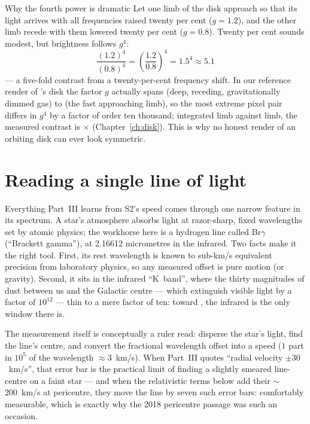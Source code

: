 \begin{worked}{Why the fourth power is dramatic}
Let one limb of the disk approach so that its light arrives with all
frequencies raised twenty per cent ($g = 1.2$), and the other limb
recede with them lowered twenty per cent ($g = 0.8$). Twenty per cent
sounds modest, but brightness follows $g^4$:
\[
\frac{(1.2)^4}{(0.8)^4} = \left(\frac{1.2}{0.8}\right)^4 = 1.5^4
\approx 5.1
\]
— a five-fold contrast from a twenty-per-cent frequency shift. In our
reference render of \sgra{}'s disk the factor $g$ actually spans
\GMin{} (deep, receding, gravitationally dimmed gas) to \GMax{} (the
fast approaching limb), so the most extreme pixel pair differs in $g^4$
by a factor of order ten thousand; integrated limb against limb, the
measured contrast is \BeamRatio$\times$ (Chapter~\ref{ch:disk}). This
is why no honest render of an orbiting disk can ever look symmetric.
\end{worked}

\section{Reading a single line of light}

Everything Part~III learns from S2's speed comes through one narrow
feature in its spectrum. A star's atmosphere absorbs light at
razor-sharp, fixed wavelengths set by atomic physics; the workhorse
here is a hydrogen line called Br$\gamma$ (``Brackett gamma''), at
2.16612 micrometres in the infrared. Two facts make it the right
tool. First, its rest wavelength is known to sub-km/s equivalent
precision from laboratory physics, so any measured offset is pure
motion (or gravity). Second, it sits in the infrared ``K~band'', where
the thirty magnitudes of dust between us and the Galactic centre —
which extinguish visible light by a factor of $10^{12}$ — thin to a
mere factor of ten: toward \sgra{}, the infrared is the only window
there is.

The measurement itself is conceptually a ruler read: disperse the
star's light, find the line's centre, and convert the fractional
wavelength offset into a speed ($1$ part in $10^{5}$ of the
wavelength $\approx 3$~km/s). When Part~III quotes ``radial velocity
$\pm 30$~km/s'', that error bar is the practical limit of finding a
slightly smeared line-centre on a faint star — and when the
relativistic terms below add their $\sim$200~km/s at pericentre, they
move the line by seven such error bars: comfortably measurable, which
is exactly why the 2018 pericentre passage was such an occasion.

